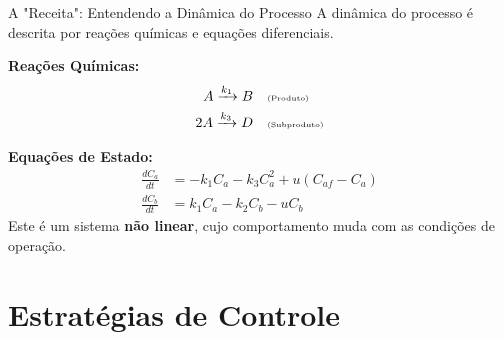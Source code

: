 \documentclass{beamer}
\begin{document}
\begin{frame}{A "Receita": Entendendo a Dinâmica do Processo}
    \small
    A dinâmica do processo é descrita por reações químicas e equações diferenciais.
    
    \textbf{Reações Químicas:}
    \begin{align*}
        A \xrightarrow{k_1} B & \quad \text{\tiny (Produto)} \\
        2A \xrightarrow{k_3} D & \quad \text{\tiny (Subproduto)}
    \end{align*}
    
    \textbf{Equações de Estado:}
    \tiny
    \begin{align*}
    \frac{dC_a}{dt} &= -k_1 C_a - k_3 C_a^2 + u(C_{af} - C_a) \\
    \frac{dC_b}{dt} &= k_1 C_a - k_2 C_b - u C_b
    \end{align*}
    \normalsize
    Este é um sistema \textbf{não linear}, cujo comportamento muda com as condições de operação.
    
\end{frame}

\section{Estratégias de Controle}
\end{document}
